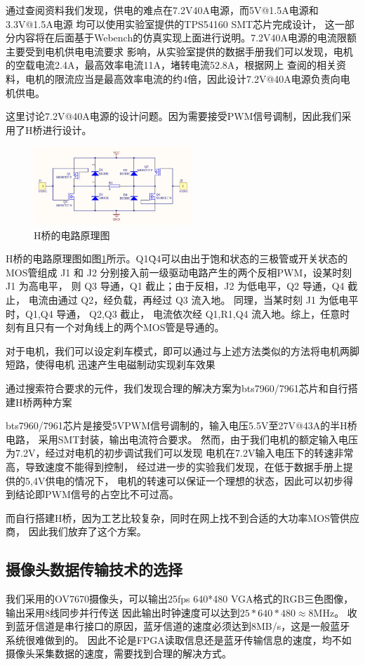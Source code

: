 \documentclass[UTF8,a4paper]{paper}
\begin{document}
通过查阅资料我们发现，供电的难点在7.2V40A电源，而5V@1.5A电源和3.3V@1.5A电源
均可以使用实验室提供的TPS54160 SMT芯片完成设计，
这一部分内容将在后面基于Webench的仿真实现上面进行说明。7.2V40A电源的电流限额主要受到电机供电电流要求
影响，从实验室提供的数据手册我们可以发现，电机的空载电流2.4A，最高效率电流11A，堵转电流52.8A，根据网上
查阅的相关资料，电机的限流应当是最高效率电流的约4倍，因此设计7.2V@40A电源负责向电机供电。

这里讨论7.2V@40A电源的设计问题。因为需要接受PWM信号调制，因此我们采用了H桥进行设计。
\begin{figure}
    \centering
    \includegraphics[width=60mm]{HBridge.jpg}
    \caption{H桥的电路原理图}
    \label{H-bridge}
\end{figure}
H桥的电路原理图如图\ref{H-bridge}所示。Q1\~Q4可以由出于饱和状态的三极管或开关状态的MOS管组成 
J1 和 J2 分别接入前一级驱动电路产生的两个反相PWM，设某时刻 J1 为高电平，
则 Q3 导通，Q1 截止；由于反相，J2 为低电平，Q2 导通，Q4 截止，
电流由通过 Q2，经负载，再经过 Q3 流入地。
同理，当某时刻 J1 为低电平时，Q1,Q4 导通， Q2,Q3 截止，
电流依次经 Q1,R1,Q4 流入地。综上，任意时刻有且只有一个对角线上的两个MOS管是导通的。

对于电机，我们可以设定刹车模式，即可以通过与上述方法类似的方法将电机两脚短路，使得电机
迅速产生电磁制动实现刹车效果

通过搜索符合要求的元件，我们发现合理的解决方案为bts7960/7961芯片和自行搭建H桥两种方案

bts7960/7961芯片是接受5VPWM信号调制的，输入电压5.5V至27V@43A的半H桥电路，
采用SMT封装，输出电流符合要求。
然而，由于我们电机的额定输入电压为7.2V，经过对电机的初步调试我们可以发现
电机在7.2V输入电压下的转速非常高，导致速度不能得到控制，
经过进一步的实验我们发现，在低于数据手册上提供的5,4V供电的情况下，
电机的转速可以保证一个理想的状态，因此可以初步得到结论即PWM信号的占空比不可过高。

而自行搭建H桥，因为工艺比较复杂，同时在网上找不到合适的大功率MOS管供应商，
因此我们放弃了这个方案。


\subsection{摄像头数据传输技术的选择}
我们采用的OV7670摄像头，可以输出25fps 640*480 VGA格式的RGB三色图像，输出采用8线同步并行传送
因此输出时钟速度可以达到$25*640*480 \approx 8\mathrm{MHz}$。
收到蓝牙信道是串行接口的原因，蓝牙信道的速度必须达到8MB/s，这是一般蓝牙系统很难做到的。
因此不论是FPGA读取信息还是蓝牙传输信息的速度，均不如摄像头采集数据的速度，需要找到合理的解决方式。
\end{document}
